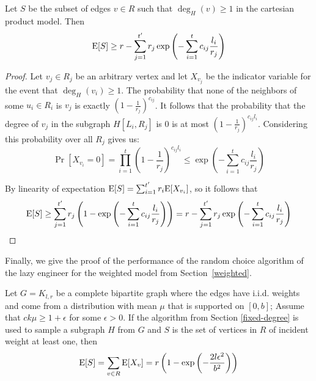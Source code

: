 \begin{thm}
Let $S$ be the subset of edges $v\in R$ such that $\deg_H(v) \geq 1$ in the cartesian product model. Then
\[ \text{E}[S] \geq r - \sum_{j=1}^{t'} r_j \exp\left(-\sum_{i=1}^t c_{ij} \frac{l_i}{r_j}\right)\]
\end{thm}
\begin{proof}
Let $v_j \in R_j$ be an arbitrary vertex and let $X_{v_j}$ be the
indicator variable for the event that $\deg_H(v_i) \geq 1$. The
probability that none of the neighbors of some $u_i\in R_i$ is $v_j$
is exactly $(1-\frac{1}{r_j})^{c_{ij}}$. It follows that the
probability that the degree of $v_j$ in the subgraph $H[L_i,R_j]$ is 0
is at most $(1-\frac{1}{r_j})^{c_{ij}l_i}$. Considering this
probability over all $R_j$ gives us:
\[ \Pr[X_{v_i} = 0] = \prod_{i=1}^{t} \left(1-\frac{1}{r_j}\right)^{c_{ij} l_i} \leq \exp\left(-\sum_{i=1}^t c_{ij} \frac{l_i}{r_j}\right)\]

By linearity of expectation $\text{E}[S] = \sum_{i=1}^{t'} r_i \text{E}[X_{v_i}]$,
so it follows that
\[ \text{E}[S] \geq \sum_{j=1}^{t'} r_j \left(1-\exp\left(-\sum_{i=1}^t c_{ij} \frac{l_i}{r_j}\right)\right) = r - \sum_{j=1}^{t'} r_j \exp\left(-\sum_{i=1}^t c_{ij} \frac{l_i}{r_j}\right)\]
\end{proof}

Finally, we give the proof of the performance of the random choice algorithm of the lazy engineer for the weighted model from Section~\ref{weighted}.
\begin{thm}
Let $G=K_{l,r}$ be a complete bipartite graph where the edges have i.i.d. weights and come from a distribution with mean $\mu$ that is supported on $[0,b]$; Assume that $ck\mu \geq 1+\epsilon$ for some $\epsilon > 0$. If the algorithm from Section \ref{fixed-degree} is used to sample a subgraph $H$ from $G$ and $S$ is the set of vertices in $R$ of incident weight at least one, then
\[ \text{E}[S] = \sum_{v\in R} \text{E}[X_v] = r\left(1-\exp\left(-\frac{2l\epsilon^2}{b^2}\right)\right) \]
\end{thm}

